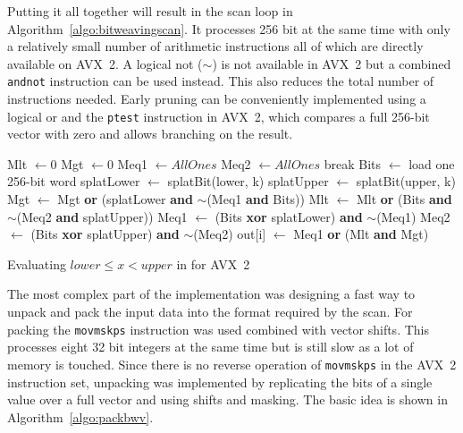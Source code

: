 Putting it all together will result in the scan loop in
Algorithm~\ref{algo:bitweavingscan}. It processes 256 bit at the same time with
only a relatively small number of arithmetic instructions all of which are
directly available on AVX~2. A logical not ($\sim$) is not available in AVX~2
but a combined \texttt{andnot} instruction can be used instead. This also
reduces the total number of instructions needed. Early pruning can be
conveniently implemented using a logical or and the \texttt{ptest} instruction
in AVX~2, which compares a full 256-bit vector with zero and allows branching on
the result.

\begin{algorithm}[h]
\begin{algorithmic}[1]
    \State Mlt $\gets 0$
    \State Mgt $\gets 0$
    \State Meq1 $\gets AllOnes$
    \State Meq2 $\gets AllOnes$
          \State break 
        \EndIf
        \State Bits $\gets$ load one 256-bit word
        \State splatLower $\gets$ splatBit(lower, k)
        \State splatUpper $\gets$ splatBit(upper, k)
        \State Mgt $\gets$ Mgt \textbf{or} (splatLower \textbf{and} $\sim$(Meq1 \textbf{and} Bits))
        \State Mlt $\gets$ Mlt \textbf{or} (Bits \textbf{and} $\sim$(Meq2 \textbf{and} splatUpper))
        \State Meq1 $\gets$ (Bits \textbf{xor} splatLower) \textbf{and} $\sim$(Meq1)
        \State Meq2 $\gets$ (Bits \textbf{xor} splatUpper) \textbf{and} $\sim$(Meq2)
      \EndFor
    \EndFor
    \State out[i] $\gets$ Meq1 \textbf{or} (Mlt \textbf{and} Mgt)
  \EndFor
  \EndProcedure
\end{algorithmic}
\caption{Evaluating $lower \le x < upper$ in \bwv{} for AVX~2}
\label{algo:bitweavingscan}
\end{algorithm}

The most complex part of the implementation was designing a fast way to unpack
and pack the input data into the format required by the \bwv{} scan. For packing
the \texttt{movmskps} instruction was used combined with vector shifts. This
processes eight 32 bit integers at the same time but is still slow as a lot of
memory is touched. Since there is no reverse operation of \texttt{movmskps} in
the AVX~2 instruction set, unpacking was implemented by replicating the bits of a
single value over a full vector and using shifts and masking. The basic idea is
shown in Algorithm~\ref{algo:packbwv}.

